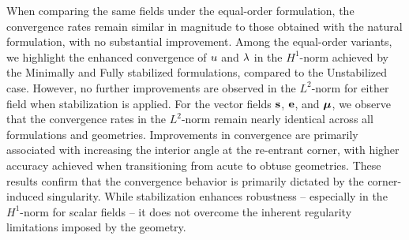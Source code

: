 When comparing the same fields under the equal-order formulation, the convergence rates remain similar in magnitude to those obtained with the natural formulation, with no substantial improvement. Among the equal-order variants, we highlight the enhanced convergence of $ u $ and $ \lambda $ in the $ H^1 $-norm achieved by the Minimally and Fully stabilized formulations, compared to the Unstabilized case. However, no further improvements are observed in the $ L^2 $-norm for either field when stabilization is applied.
For the vector fields $ \mathbf{s}$, $ \mathbf{e} $, and $ \boldsymbol{\mu} $, we observe that the convergence rates in the $ L^2 $-norm remain nearly identical across all formulations and geometries. Improvements in convergence are primarily associated with increasing the interior angle at the re-entrant corner, with higher accuracy achieved when transitioning from acute to obtuse geometries. 
These results confirm that the convergence behavior is primarily dictated by the corner-induced singularity. While stabilization enhances robustness -- especially in the $H^1$-norm for scalar fields -- it does not overcome the inherent regularity limitations imposed by the geometry. 
